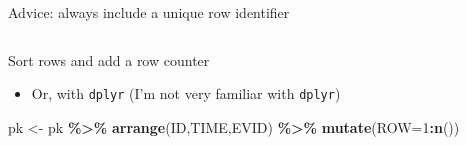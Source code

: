 \documentclass[
  8pt,
  ignorenonframetext,
  aspectratio=169]{beamer}
\newenvironment{Shaded}{\begin{snugshade}}{\end{snugshade}}
\newcommand{\DataTypeTok}[1]{\textcolor[rgb]{0.13,0.29,0.53}{#1}}
\newcommand{\DecValTok}[1]{\textcolor[rgb]{0.00,0.00,0.81}{#1}}
\newcommand{\KeywordTok}[1]{\textcolor[rgb]{0.13,0.29,0.53}{\textbf{#1}}}
\newcommand{\NormalTok}[1]{#1}
\newcommand{\OperatorTok}[1]{\textcolor[rgb]{0.81,0.36,0.00}{\textbf{#1}}}
\newcommand{\StringTok}[1]{\textcolor[rgb]{0.31,0.60,0.02}{#1}}
\providecommand{\tightlist}{%
  \setlength{\itemsep}{0pt}\setlength{\parskip}{0pt}}
\begin{document}
\begin{frame}[fragile]{Advice: always include a unique row identifier}
\begin{columns}[T]
\begin{column}{0.48\textwidth}
\begin{block}{Sort rows and add a row counter}
\begin{itemize}
\tightlist
\item
  Or, with \texttt{dplyr} (I'm not very familiar with \texttt{dplyr})
\end{itemize}

\begin{Shaded}
\begin{Highlighting}[]
\NormalTok{pk \textless{}{-}}\StringTok{ }\NormalTok{pk }\OperatorTok{\%\textgreater{}\%}
\StringTok{    }\KeywordTok{arrange}\NormalTok{(ID,TIME,EVID) }\OperatorTok{\%\textgreater{}\%}
\StringTok{    }\KeywordTok{mutate}\NormalTok{(}\DataTypeTok{ROW=}\DecValTok{1}\OperatorTok{:}\KeywordTok{n}\NormalTok{())}
\end{Highlighting}
\end{Shaded}
\end{block}
\end{column}
\end{columns}
\end{frame}
\end{document}
